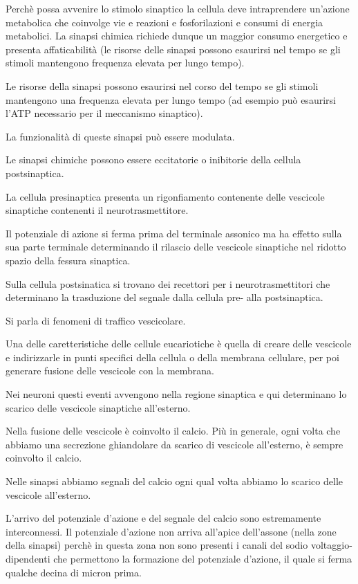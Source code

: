 \documentclass[]{article}
\begin{document}
Perchè possa avvenire lo stimolo sinaptico la cellula deve intraprendere
un'azione metabolica che coinvolge vie e reazioni e fosforilazioni e
consumi di energia metabolici. La sinapsi chimica richiede dunque un
maggior consumo energetico e presenta affaticabilità (le risorse delle
sinapsi possono esaurirsi nel tempo se gli stimoli mantengono frequenza
elevata per lungo tempo).

Le risorse della sinapsi possono esaurirsi nel corso del tempo se gli
stimoli mantengono una frequenza elevata per lungo tempo (ad esempio può
esaurirsi l'ATP necessario per il meccanismo sinaptico).

La funzionalità di queste sinapsi può essere modulata.

Le sinapsi chimiche possono essere eccitatorie o inibitorie della
cellula postsinaptica.

La cellula presinaptica presenta un rigonfiamento contenente delle
vescicole sinaptiche contenenti il neurotrasmettitore.

Il potenziale di azione si ferma prima del terminale assonico ma ha
effetto sulla sua parte terminale determinando il rilascio delle
vescicole sinaptiche nel ridotto spazio della fessura sinaptica.

Sulla cellula postsinatica si trovano dei recettori per i
neurotrasmettitori che determinano la trasduzione del segnale dalla
cellula pre- alla postsinaptica.

Si parla di fenomeni di traffico vescicolare.

Una delle caretteristiche delle cellule eucariotiche è quella di creare
delle vescicole e indirizzarle in punti specifici della cellula o della
membrana cellulare, per poi generare fusione delle vescicole con la
membrana.

Nei neuroni questi eventi avvengono nella regione sinaptica e qui
determinano lo scarico delle vescicole sinaptiche all'esterno.

Nella fusione delle vescicole è coinvolto il calcio. Più in generale,
ogni volta che abbiamo una secrezione ghiandolare da scarico di
vescicole all'esterno, è sempre coinvolto il calcio.

Nelle sinapsi abbiamo segnali del calcio ogni qual volta abbiamo lo
scarico delle vescicole all'esterno.

L'arrivo del potenziale d'azione e del segnale del calcio sono
estremamente interconnessi. Il potenziale d'azione non arriva all'apice
dell'assone (nella zone della sinapsi) perchè in questa zona non sono
presenti i canali del sodio voltaggio-dipendenti che permettono la
formazione del potenziale d'azione, il quale si ferma qualche decina di
micron prima.
\end{document}
